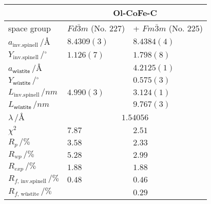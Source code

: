 \documentclass[\main/dresen_thesis.tex]{subfiles}
\begin{document}
\begin{table}[ht]
\begin{tabular}{ l | l | l }
      \hline
      \hline
      \rule{0pt}{2ex} & \multicolumn{2}{c}{\textbf{Ol-CoFe-C}}\\
      \hline
      \hline
      \rule{0pt}{2ex}space group & $Fd\bar{3}m$ (No. 227) & + $Fm\bar{3}m$ (No. 225)\\
      \hline
      \rule{0pt}{2ex} $a_\mathrm{inv. spinell} \,/ \unit{\angstrom}$         & $8.4309(3)$ & $8.4384(4)$  \\
      \rule{0pt}{2ex} $Y_\mathrm{inv. spinell} \,/ \unit{^\circ}$            & $1.126(7)$  & $1.798(8)$   \\
      \rule{0pt}{2ex} $a_\textsf{w\"ustite}     \,/ \unit{\angstrom}$        &             & $4.2125(1)$  \\
      \rule{0pt}{2ex} $Y_\textsf{w\"ustite}     \,/ \unit{^\circ}$           &             & $0.575(3)$   \\
      \hline
      \rule{0pt}{2ex} $L_\mathrm{inv. spinell} \,/ \unit{nm}$                & $4.990(3)$  & $3.124(1)$ \\
      \rule{0pt}{2ex} $L_\textsf{w\"ustite}      \,/ \unit{nm}$              &             & $9.767(3)$ \\
      \hline
      \rule{0pt}{2ex} $\lambda \,/ \unit{\angstrom}$  & \multicolumn{2}{c}{$1.54056$}\\
      \hline
      \rule{0pt}{2ex} $\chi^2$                                               & $7.87$      & $2.51$ \\
      \rule{0pt}{2ex} $R_p \,/ \unit{\%}$                                                  & $3.58$      & $2.33$ \\
      \rule{0pt}{2ex} $R_{wp} \,/ \unit{\%}$                                               & $5.28$      & $2.99$ \\
      \rule{0pt}{2ex} $R_{exp} \,/ \unit{\%}$                                              & $1.88$      & $1.88$ \\
      \rule{0pt}{2ex} $R_{f, \, \mathrm{inv. spinell}} \,/ \unit{\%}$                      & $0.48$      & $0.46$ \\
      \rule{0pt}{2ex} $R_{f, \, \text{w\"ustite}} \,/ \unit{\%}$                           &             & $0.29$ \\
      \hline
    \end{tabular}
  \end{table}
\end{document}
